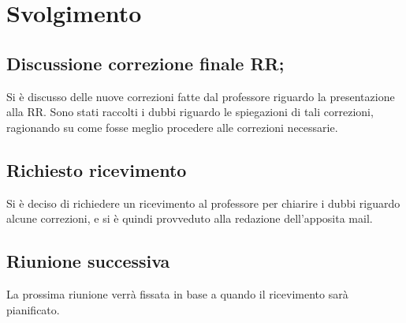 \documentclass[]{article}
\begin{document}
	\newpage

	\section{Svolgimento}
		\subsection{Discussione correzione finale RR;}
		Si è discusso delle nuove correzioni fatte dal professore riguardo la presentazione alla RR.
		Sono stati raccolti i dubbi riguardo le spiegazioni di tali correzioni, ragionando su come fosse meglio procedere alle correzioni necessarie.\\
		
		\subsection{Richiesto ricevimento}
		Si è deciso di richiedere un ricevimento al professore per chiarire i dubbi riguardo alcune correzioni, e si è quindi provveduto alla redazione dell'apposita mail.\\
		
		\subsection{Riunione successiva}
		La prossima riunione verrà fissata in base a quando il ricevimento sarà pianificato.\\
	
\end{document}
